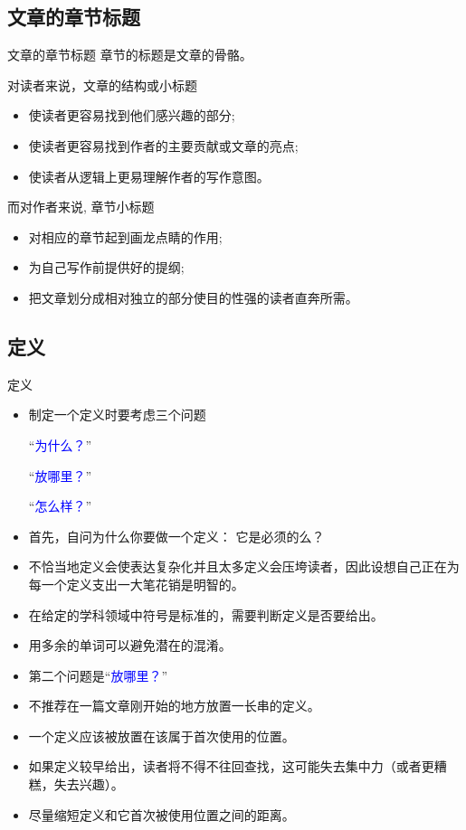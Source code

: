 \documentclass[13pt]{ctexbeamer}
\newcommand{\blue}[1]{\textcolor{blue}{#1}}
\begin{document}
\subsection{文章的章节标题}
\begin{frame}{文章的章节标题}
章节的标题是文章的骨骼。

对读者来说，文章的结构或小标题

\begin{itemize}
    \item  使读者更容易找到他们感兴趣的部分;
\item 使读者更容易找到作者的主要贡献或文章的亮点;
\item 使读者从逻辑上更易理解作者的写作意图。
\end{itemize}


而对作者来说, 章节小标题
\begin{itemize}
    \item  对相应的章节起到画龙点睛的作用;

\item 为自己写作前提供好的提纲;

\item 把文章划分成相对独立的部分使目的性强的读者直奔所需。
\end{itemize}
\end{frame}




\subsection{定义}
\begin{frame}{定义}
	\begin{itemize}
		\item
		制定一个定义时要考虑三个问题

		``\blue{为什么？}''

		``\blue{放哪里？}''

		``\blue{怎么样？}''
		\item
		首先，自问为什么你要做一个定义： 它是必须的么？
		\item
		不恰当地定义会使表达复杂化并且太多定义会压垮读者，因此设想自己正在为每一个定义支出一大笔花销是明智的。
		\item
		在给定的学科领域中符号是标准的，需要判断定义是否要给出。
		\item
		用多余的单词可以避免潜在的混淆。
	\end{itemize}
\end{frame}


\begin{frame}
	\begin{itemize}
		\item  第二个问题是``\blue{放哪里？}''
		\item 不推荐在一篇文章刚开始的地方放置一长串的定义。
		\item  一个定义应该被放置在该属于首次使用的位置。
		\item 如果定义较早给出，读者将不得不往回查找，这可能失去集中力（或者更糟糕，失去兴趣）。
		\item 尽量缩短定义和它首次被使用位置之间的距离。
	\end{itemize}
\end{frame}
\end{document}
